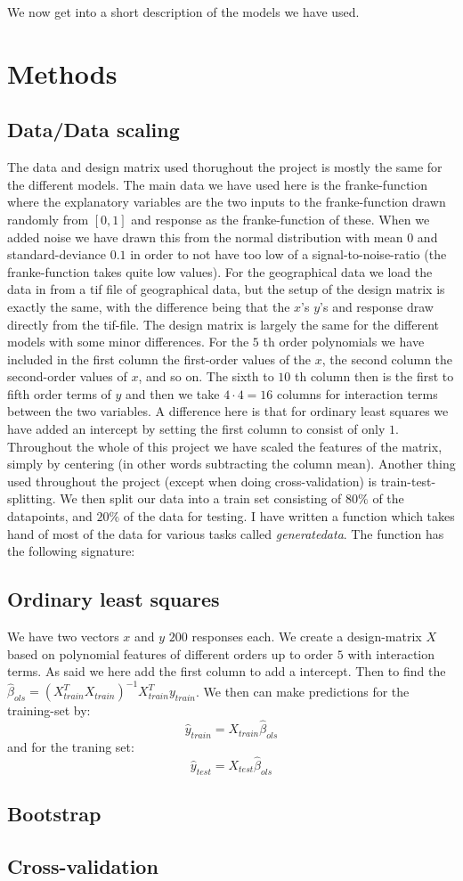 \documentclass{article}
\begin{document}
We now get into a short description of the models we have used.

\section{Methods}
\subsection{Data/Data scaling}
The data and design matrix used thorughout the project is mostly the same for
the different models. The main data we have used here is the franke-function
where the explanatory variables are the two inputs to the franke-function drawn
randomly from $\left[ 0, 1 \right]$ and response as the franke-function of
these. When we added noise we have drawn this from the normal distribution with
mean $0$ and standard-deviance $0.1$ in order to not have too low of a
signal-to-noise-ratio (the franke-function takes quite low values). For the
geographical data we load the data in from a tif file of geographical data, but
the setup of the design matrix is exactly the same, with the difference being
that the $x$'s $y$'s and response draw directly from the tif-file. The design
matrix is largely the same for the different models with some minor differences.
For the $5$ th order polynomials we have included in the first column the
first-order values of the $x$, the second column the second-order values of $x$,
and so on. The sixth to $10$ th column then is the first to fifth order terms of
$y$ and then we take $4 \cdot 4 = 16$ columns for interaction terms between the
two variables. A difference here is that for ordinary least squares we have
added an intercept by setting the first column to consist of only $1$.
Throughout the whole of this project we have scaled the features of the matrix,
simply by centering (in other words subtracting the column mean). Another thing
used throughout the project (except when doing cross-validation) is
train-test-splitting. We then split our data into a train set consisting of
$80\%$ of the datapoints, and $20\%$ of the data for testing. I have written a
function which takes hand of most of the data for various tasks called
\textit{generatedata}. The function has the following signature:

\subsection{Ordinary least squares}
We have two vectors $x$ and $y$ $200$ responses each. We create a design-matrix
$X$ based on polynomial features of different orders up to order $5$ with
interaction terms. As said we here add the first column to add a intercept. Then
to find the $\hat{\beta}_{ols} = (X^T_{train} X_{train})^{-1} X^T_{train}
y_{train}$. We then can make predictions for the training-set by:
$$\hat{y}_{train} = X_{train} \hat{\beta}_{ols}$$
and for the traning set:
$$\hat{y}_{test} = X_{test} \hat{\beta}_{ols}$$

\subsection{Bootstrap}

\subsection{Cross-validation}
\end{document}
